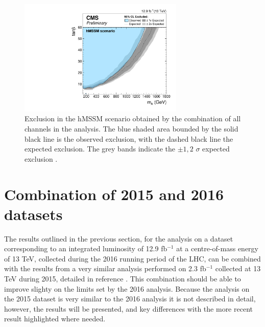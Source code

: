 \begin{figure}[h!]
\begin{center}
\includegraphics[width=0.7\textwidth]{./MSSM/Figures/CMS-PAS-HIG-16-037_Figure_012-b.pdf}
\end{center}
\caption{Exclusion in the hMSSM scenario obtained by the combination
of all channels in the \AHtotautau analysis. The blue shaded area bounded by the 
solid black line is the observed exclusion, with the dashed black line the
expected exclusion. The grey bands indicate the $\pm 1,2$ $\sigma$ 
expected exclusion \cite{CMS-PAS-HIG-16-037}.}
\label{fig:mssm_hmssm_2016}
\end{figure}


\section{Combination of 2015 and 2016 datasets}
\label{sec:mssm_combination}
The results outlined in the previous section, for the analysis
on a dataset corresponding to an integrated luminosity of 12.9 fb$^{-1}$
at a centre-of-mass energy of 13 TeV, collected during the 2016 running period
of the \ac{LHC}, can be combined with the results from a very similar analysis
performed on 2.3 fb$^{-1}$ collected at 13 TeV during 2015, detailed
in reference \cite{CMS-PAS-HIG-16-006}. This combination should be able
to improve slighty on the limits set by the 2016 analysis. Because the 
analysis on the 2015 dataset is very similar to the 2016 analysis it 
is not described in detail, however, the results will
be presented, and key differences with the more recent result highlighted
where needed.

